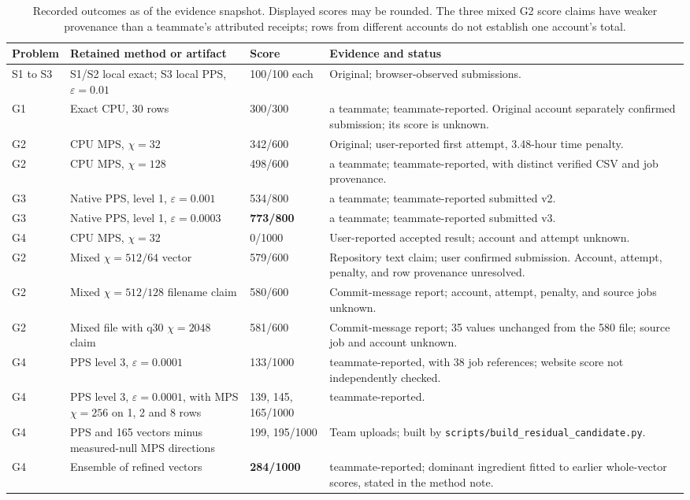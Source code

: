 \documentclass[11pt]{article}
\newcommand{\file}[1]{\nolinkurl{#1}}
\newcommand{\eps}{\varepsilon}
\begin{document}
\begin{table}[h!]
\centering
\small
\begin{tabularx}{\textwidth}{@{}L{0.66in}L{2.12in}L{0.75in}X@{}}
\toprule
Problem & Retained method or artifact & Score & Evidence and status \\
\midrule
S1 to S3 & S1/S2 local exact; S3 local PPS, $\eps=0.01$ & 100/100 each & Original; browser-observed submissions. \\
G1 & Exact CPU, 30 rows & 300/300 & a teammate; teammate-reported. Original account separately confirmed submission; its score is unknown. \\
G2 & CPU MPS, $\chi=32$ & 342/600 & Original; user-reported first attempt, 3.48-hour time penalty. \\
G2 & CPU MPS, $\chi=128$ & 498/600 & a teammate; teammate-reported, with distinct verified CSV and job provenance. \\
G3 & Native PPS, level 1, $\eps=0.001$ & 534/800 & a teammate; teammate-reported submitted v2. \\
G3 & Native PPS, level 1, $\eps=0.0003$ & \textbf{773/800} & a teammate; teammate-reported submitted v3. \\
G4 & CPU MPS, $\chi=32$ & 0/1000 & User-reported accepted result; account and attempt unknown. \\
G2 & Mixed $\chi=512/64$ vector & 579/600 & Repository text claim; user confirmed submission. Account, attempt, penalty, and row provenance unresolved. \\
G2 & Mixed $\chi=512/128$ filename claim & 580/600 & Commit-message report; account, attempt, penalty, and source jobs unknown. \\
G2 & Mixed file with q30 $\chi=2048$ claim & 581/600 & Commit-message report; 35 values unchanged from the 580 file; source job and account unknown. \\
G4 & PPS level 3, $\eps=0.0001$ & 133/1000 & teammate-reported, with 38 job references; website score not independently checked. \\
G4 & PPS level 3, $\eps=0.0001$, with MPS $\chi=256$ on 1, 2 and 8 rows & 139, 145, 165/1000 & teammate-reported. \\
G4 & PPS and 165 vectors minus measured-null MPS directions & 199, 195/1000 & Team uploads; built by \file{scripts/build_residual_candidate.py}. \\
G4 & Ensemble of refined vectors & \textbf{284/1000} & teammate-reported; dominant ingredient fitted to earlier whole-vector scores, stated in the method note. \\
\bottomrule
\end{tabularx}
\caption{Recorded outcomes as of the evidence snapshot. Displayed scores may be rounded. The three mixed G2 score claims have weaker provenance than a teammate's attributed receipts; rows from different accounts do not establish one account's total.}
\label{tab:results}
\end{table}
\end{document}
